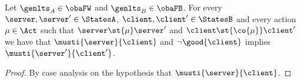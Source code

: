 
\begin{lemma}%
  \label{lem:musti-presereved-by-actions-of-unsuccesful-tests}
  Let $\genlts_A \in \obaFW$ and $\genlts_B \in  \obaFB$.
  For every $\server, \server' \in \StatesA$, $\client, \client' \in \StatesB$
  and every action $\mu \in \Act$ such that
  $\server \st{ \mu } \server'$ and $\client \st{ \co{\mu}} \client'$
  we have that $\musti{\server}{\client}$ and $\lnot \good{\client}$ implies $\musti{\server'}{\client'}$.%
\end{lemma}
\noindent
\begin{proof}
  By case analysis on the hypothesis that $\musti{\server}{\client}$.
\end{proof}
